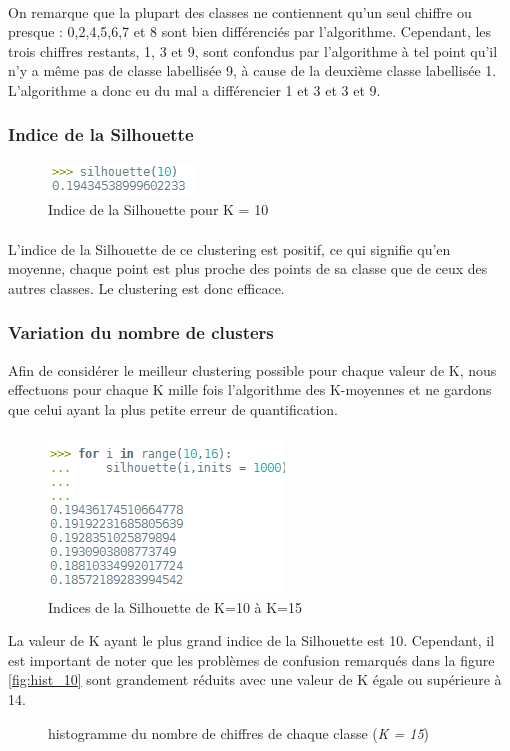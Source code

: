\documentclass{article}
\begin{document}
\paragraph{}On remarque que la plupart des classes ne contiennent qu'un seul chiffre ou presque : 0,2,4,5,6,7 et 8 sont bien différenciés par l'algorithme. Cependant, les trois chiffres restants, 1, 3 et 9, sont confondus par l'algorithme à tel point qu'il n'y a même pas de classe labellisée 9, à cause de la deuxième classe labellisée 1.
L'algorithme a donc eu du mal a différencier 1 et 3 et 3 et 9.
\subsubsection{Indice de la Silhouette}
\begin{figure}[H]
    \centering
    \includegraphics{silhouette(10).PNG}
    \caption{Indice de la Silhouette pour K = 10}
\end{figure}
\paragraph{}L'indice de la Silhouette de ce clustering est positif, ce qui signifie qu'en moyenne, chaque point est plus proche des points de sa classe que de ceux des autres classes. Le clustering est donc efficace.
\subsubsection{Variation du nombre de clusters}
Afin de considérer le meilleur clustering possible pour chaque valeur de K, nous effectuons pour chaque K mille fois l'algorithme des K-moyennes et ne gardons que celui ayant la plus petite erreur de quantification.
\paragraph{}
\begin{figure}[H]
    \centering
    \includegraphics[scale = 0.8]{silhouette(10_15).PNG}
    \caption{Indices de la Silhouette de K=10 à K=15}
\end{figure}
La valeur de K ayant le plus grand indice de la Silhouette est 10. Cependant, il est important de noter que les problèmes de confusion remarqués dans la figure \ref{fig:hist_10} sont grandement réduits avec une valeur de K égale ou supérieure à 14.
\begin{figure}[H]
    \centering
    \caption{histogramme du nombre de chiffres de chaque classe (\textit{K = 15})}
\end{figure}
\end{document}
